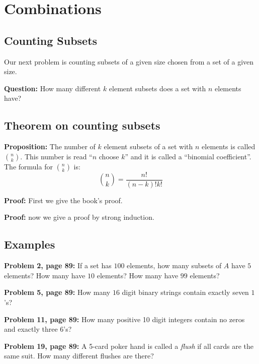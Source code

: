 \documentclass[
]{article}
\author{}
\date{}
\begin{document}
\hypertarget{combinations}{%
\section{Combinations}\label{combinations}}

\hypertarget{counting-subsets}{%
\subsection{Counting Subsets}\label{counting-subsets}}

Our next problem is counting subsets of a given size chosen from a set
of a given size.

\textbf{Question:} How many different \(k\) element subsets does a set
with \(n\) elements have?

\vfill\eject

\hypertarget{theorem-on-counting-subsets}{%
\subsection{Theorem on counting
subsets}\label{theorem-on-counting-subsets}}

\textbf{Proposition:} The number of \(k\) element subsets of a set with
\(n\) elements is called \(\binom{n}{k}\). This number is read ``\(n\)
choose \(k\)'' and it is called a ``binomial coefficient''. The formula
for \(\binom{n}{k}\) is: \[
\binom{n}{k}=\frac{n!}{(n-k)!k!}
\]

\textbf{Proof:} First we give the book's proof.

\vfill\eject

\textbf{Proof:} now we give a proof by strong induction.

\vfill\eject

\hypertarget{examples}{%
\subsection{Examples}\label{examples}}

\textbf{Problem 2, page 89:} If a set has \(100\) elements, how many
subsets of \(A\) have \(5\) elements? How many have \(10\) elements? How
many have \(99\) elements?

\vfill\eject

\textbf{Problem 5, page 89:} How many \(16\) digit binary strings
contain exactly seven \(1\)'s?

\vfill\eject

\textbf{Problem 11, page 89:} How many positive 10 digit integers
contain no zeros and exactly three 6's?

\vfill\eject

\textbf{Problem 19, page 89:} A 5-card poker hand is called a
\emph{flush} if all cards are the same suit. How many different flushes
are there?
\end{document}
